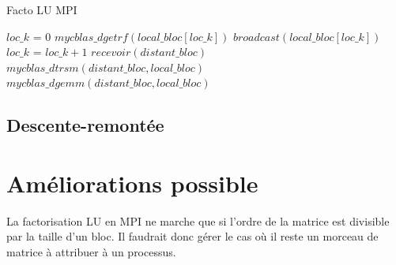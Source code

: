 \documentclass{article}
\begin{document}
\begin{algorithm}
  \caption{Facto LU MPI}\label{algo:lu}
  \begin{algorithmic}[1]
    \State $ loc\_k $ = $ 0 $
    \State $ mycblas\_dgetrf(local\_bloc[loc\_k]) $
    \State $ broadcast(local\_bloc[loc\_k]) $
    \State $ loc\_k $ = $ loc\_k + 1 $
    \Else
    \State $ recevoir(distant\_bloc) $
    \State $ mycblas\_dtrsm(distant\_bloc, local\_bloc) $
    \State $ mycblas\_dgemm(distant\_bloc, local\_bloc) $
    \EndIf
    \EndFor

  \end{algorithmic}
\end{algorithm}


\subsection{Descente-remontée}

\section{Améliorations possible}
La factorisation LU en MPI ne marche que si l'ordre de la matrice est divisible par la taille d'un bloc. Il faudrait donc gérer le cas où il reste un morceau de matrice à attribuer à un processus.
\end{document}

